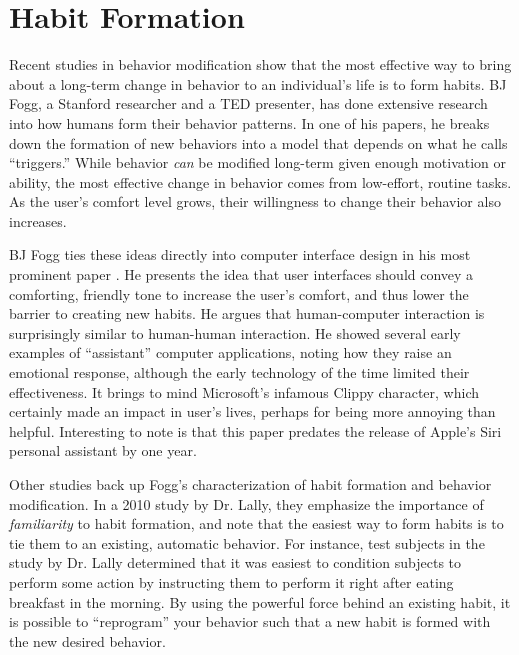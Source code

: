 \section{Habit Formation}
\par Recent studies in behavior modification show that the most effective way to bring about a long-term change in behavior to an individual's life is to form habits. BJ Fogg, a Stanford researcher and a TED presenter, has done extensive research into how humans form their behavior patterns. In one of his papers, he breaks down the formation of new behaviors into a model that depends on what he calls ``triggers.'' \cite{fogg2009behavior} While behavior \textit{can} be modified long-term given enough motivation or ability, the most effective change in behavior comes from low-effort, routine tasks. As the user's comfort level grows, their willingness to change their behavior also increases.

\par BJ Fogg ties these ideas directly into computer interface design in his most prominent paper \cite{2002persuasive}. He presents the idea that user interfaces should convey a comforting, friendly tone to increase the user's comfort, and thus lower the barrier to creating new habits. He argues that human-computer interaction is surprisingly similar to human-human interaction. He showed several early examples of ``assistant'' computer applications, noting how they raise an emotional response, although the early technology of the time limited their effectiveness. It brings to mind Microsoft's infamous Clippy character, which certainly made an impact in user's lives, perhaps for being more annoying than helpful. Interesting to note is that this paper predates the release of Apple's Siri personal assistant by one year.

\par Other studies back up Fogg's characterization of habit formation and behavior modification. In a 2010 study by Dr. Lally, they emphasize the importance of \textit{familiarity} to habit formation, and note that the easiest way to form habits is to tie them to an existing, automatic behavior. For instance, test subjects in the study by Dr. Lally determined that it was easiest to condition subjects to perform some action by instructing them to perform it right after eating breakfast in the morning. By using the powerful force behind an existing habit, it is possible to ``reprogram'' your behavior such that a new habit is formed with the new desired behavior.

